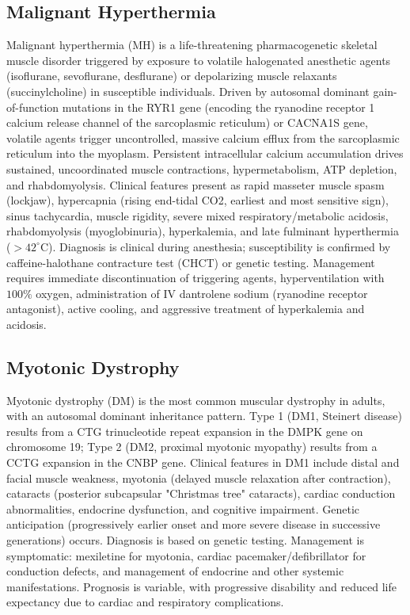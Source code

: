 \subsection{Malignant Hyperthermia}
\label{sec:Malignant Hyperthermia}
Malignant hyperthermia (MH) is a life-threatening pharmacogenetic skeletal muscle disorder triggered by exposure to volatile halogenated anesthetic agents (isoflurane, sevoflurane, desflurane) or depolarizing muscle relaxants (succinylcholine) in susceptible individuals. Driven by autosomal dominant gain-of-function mutations in the RYR1 gene (encoding the ryanodine receptor 1 calcium release channel of the sarcoplasmic reticulum) or CACNA1S gene, volatile agents trigger uncontrolled, massive calcium efflux from the sarcoplasmic reticulum into the myoplasm. Persistent intracellular calcium accumulation drives sustained, uncoordinated muscle contractions, hypermetabolism, ATP depletion, and rhabdomyolysis. Clinical features present as rapid masseter muscle spasm (lockjaw), hypercapnia (rising end-tidal CO2, earliest and most sensitive sign), sinus tachycardia, muscle rigidity, severe mixed respiratory/metabolic acidosis, rhabdomyolysis (myoglobinuria), hyperkalemia, and late fulminant hyperthermia ($>42^\circ\text{C}$). Diagnosis is clinical during anesthesia; susceptibility is confirmed by caffeine-halothane contracture test (CHCT) or genetic testing. Management requires immediate discontinuation of triggering agents, hyperventilation with $100\%$ oxygen, administration of IV dantrolene sodium (ryanodine receptor antagonist), active cooling, and aggressive treatment of hyperkalemia and acidosis.

\subsection{Myotonic Dystrophy}
\label{sec:Myotonic Dystrophy}
Myotonic dystrophy (DM) is the most common muscular dystrophy in adults, with an autosomal dominant inheritance pattern. Type 1 (DM1, Steinert disease) results from a CTG trinucleotide repeat expansion in the DMPK gene on chromosome 19; Type 2 (DM2, proximal myotonic myopathy) results from a CCTG expansion in the CNBP gene. Clinical features in DM1 include distal and facial muscle weakness, myotonia (delayed muscle relaxation after contraction), cataracts (posterior subcapsular "Christmas tree" cataracts), cardiac conduction abnormalities, endocrine dysfunction, and cognitive impairment. Genetic anticipation (progressively earlier onset and more severe disease in successive generations) occurs. Diagnosis is based on genetic testing. Management is symptomatic: mexiletine for myotonia, cardiac pacemaker/defibrillator for conduction defects, and management of endocrine and other systemic manifestations. Prognosis is variable, with progressive disability and reduced life expectancy due to cardiac and respiratory complications.

